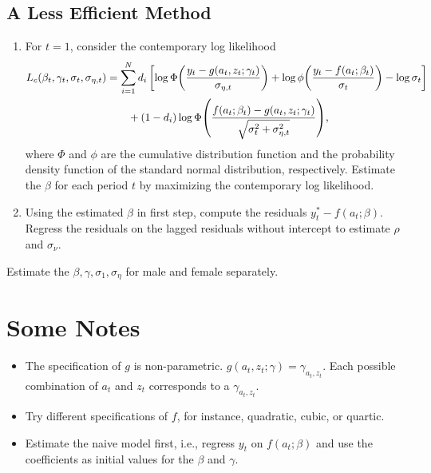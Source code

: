 \documentclass[a4paper, 12pt]{article}
\begin{document}
\subsection{A Less Efficient Method}
\begin{enumerate}
    \item For $t = 1$, consider the contemporary log likelihood 
    \begin{equation*}
        \begin{split}
            L_c(\beta_t,\gamma_t,\sigma_t,\sigma_{\eta,t}) &= \sum_{i=1}^N d_i\sbrc{\log\Phi\pth{\frac{y_t - g(a_t,z_t;\gamma_t)}{\sigma_{\eta,t}}} + \log\phi\pth{\frac{y_t - f(a_t;\beta_t)}{\sigma_t}} - \log\sigma_t} \\
            &\qquad + (1 - d_i)\log\Phi\pth{\frac{f(a_t;\beta_t) - g(a_t,z_t;\gamma_t)}{\sqrt{\sigma_t^2 + \sigma_{\eta,t}^2}}},
        \end{split}
    \end{equation*}
    where $\Phi$ and $\phi$ are the cumulative distribution function and the probability 
    density function of the standard normal distribution, respectively. Estimate the 
    $\beta$ for each period $t$ by maximizing the contemporary log likelihood. 
    \item Using the estimated $\beta$ in first step, compute the residuals $y_t^* - f(a_t;\beta)$. 
    Regress the residuals on the lagged residuals without intercept to estimate $\rho$ and $\sigma_\nu$. 
\end{enumerate}
Estimate the $\beta,\gamma,\sigma_1,\sigma_\eta$ for male and female separately. 

\section{Some Notes}
\begin{itemize}
    \item The specification of $g$ is non-parametric. $g(a_t,z_t;\gamma) = \gamma_{a_t,z_t}$. Each possible 
    combination of $a_t$ and $z_t$ corresponds to a $\gamma_{a_t,z_t}$.
    \item Try different specifications of $f$, for instance, quadratic, cubic, or quartic. 
    \item Estimate the naive model first, i.e., regress $y_t$ on $f(a_t;\beta)$ and use 
    the coefficients as initial values for the $\beta$ and $\gamma$.
\end{itemize}

%
%
\end{document}
